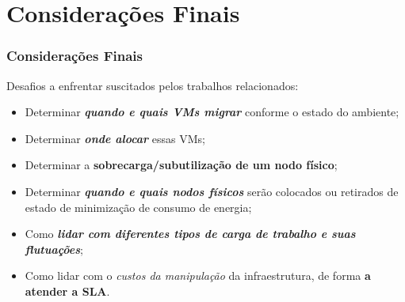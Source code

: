 %
%

\section{Considerações Finais}

\frame
{
\frametitle{Considerações Finais}
\begin{block}{Desafios a enfrentar suscitados pelos trabalhos relacionados:}
	\begin{itemize}
		\item Determinar \textbf{\textit{quando e quais VMs migrar}} conforme o estado do ambiente;
		\item Determinar \textbf{\textit{onde alocar}} essas VMs;
		\item Determinar a \textbf{sobrecarga/subutilização de um nodo físico};
		\item Determinar \textbf{\textit{quando e quais nodos físicos} }serão colocados ou retirados de estado de minimização de consumo de energia;
		\item Como \textit{\textbf{lidar com diferentes tipos de carga de trabalho e suas flutuações}};
		\item Como lidar com o \textit{custos da manipulação} da infraestrutura, de forma \textbf{a atender a SLA}.
	\end{itemize}
\end{block}

}



